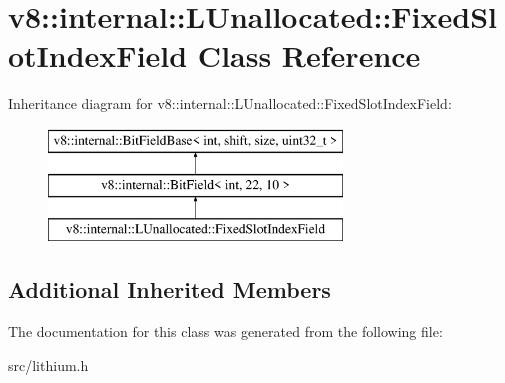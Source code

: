 \hypertarget{classv8_1_1internal_1_1_l_unallocated_1_1_fixed_slot_index_field}{}\section{v8\+:\+:internal\+:\+:L\+Unallocated\+:\+:Fixed\+Slot\+Index\+Field Class Reference}
\label{classv8_1_1internal_1_1_l_unallocated_1_1_fixed_slot_index_field}
Inheritance diagram for v8\+:\+:internal\+:\+:L\+Unallocated\+:\+:Fixed\+Slot\+Index\+Field\+:\begin{figure}[H]
\begin{center}
\leavevmode
\includegraphics[height=3.000000cm]{classv8_1_1internal_1_1_l_unallocated_1_1_fixed_slot_index_field}
\end{center}
\end{figure}
\subsection*{Additional Inherited Members}


The documentation for this class was generated from the following file\+:\begin{DoxyCompactItemize}
\item 
src/lithium.\+h\end{DoxyCompactItemize}
